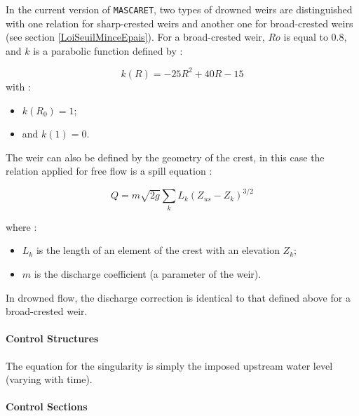 \vspace{0.5cm}

In the current version of \texttt{MASCARET}, two types of drowned weirs are distinguished with one relation for sharp-crested weirs and another one for broad-crested weirs (see section \ref{LoiSeuilMinceEpais}). For a broad-crested weir, $Ro$ is equal to 0.8, and $k$ is a parabolic function defined by :

\begin{equation}
  k(R) = -25 R^2 + 40 R -15
\end{equation}
with :
\begin{itemize}
 \item $k(R_0) = 1$;
 \item and $k(1) = 0$.
\end{itemize}

\vspace{0.5cm}

The weir can also be defined by the geometry of the crest, in this case the relation applied for free flow is a spill equation :


\begin{equation}
  Q = m \sqrt{2 g} \sum_{k} L_k (Z_{us} - Z_k)^{3/2}
\end{equation}

where :
\begin{itemize}
 \item $L_k$ is the length of an element of the crest with an elevation $Z_k$;
 \item $m$ is the discharge coefficient (a parameter of the weir).
\end{itemize}

\vspace{0.5cm}

In drowned flow, the discharge correction is identical to that defined above for a broad-crested weir.



\paragraph{Control Structures\\}

\hspace*{1cm}

The equation for the singularity is simply the imposed upstream water level (varying with time).



\paragraph{Control Sections\\}

